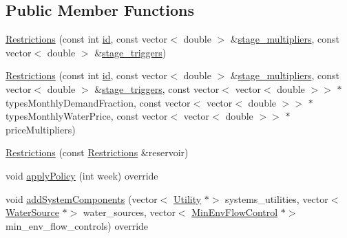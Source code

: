 \subsection*{Public Member Functions}
\begin{DoxyCompactItemize}
\item 
\mbox{\hyperlink{classRestrictions_aec6f37bfaec7d6e22e82945289fd9acc_aec6f37bfaec7d6e22e82945289fd9acc}{Restrictions}} (const int \mbox{\hyperlink{classDroughtMitigationPolicy_abf3ed19ed98e0d74dc9ae24094be640b_abf3ed19ed98e0d74dc9ae24094be640b}{id}}, const vector$<$ double $>$ \&\mbox{\hyperlink{classRestrictions_ae05c6899c05a7ffe39c4ceb7cdcd3daf_ae05c6899c05a7ffe39c4ceb7cdcd3daf}{stage\+\_\+multipliers}}, const vector$<$ double $>$ \&\mbox{\hyperlink{classRestrictions_a1c519068b4ab14737f726817f1edf9d0_a1c519068b4ab14737f726817f1edf9d0}{stage\+\_\+triggers}})
\item 
\mbox{\hyperlink{classRestrictions_a78083b572f1368bb863d40d7da807077_a78083b572f1368bb863d40d7da807077}{Restrictions}} (const int \mbox{\hyperlink{classDroughtMitigationPolicy_abf3ed19ed98e0d74dc9ae24094be640b_abf3ed19ed98e0d74dc9ae24094be640b}{id}}, const vector$<$ double $>$ \&\mbox{\hyperlink{classRestrictions_ae05c6899c05a7ffe39c4ceb7cdcd3daf_ae05c6899c05a7ffe39c4ceb7cdcd3daf}{stage\+\_\+multipliers}}, const vector$<$ double $>$ \&\mbox{\hyperlink{classRestrictions_a1c519068b4ab14737f726817f1edf9d0_a1c519068b4ab14737f726817f1edf9d0}{stage\+\_\+triggers}}, const vector$<$ vector$<$ double $>$$>$ $\ast$types\+Monthly\+Demand\+Fraction, const vector$<$ vector$<$ double $>$$>$ $\ast$types\+Monthly\+Water\+Price, const vector$<$ vector$<$ double $>$$>$ $\ast$price\+Multipliers)
\item 
\mbox{\hyperlink{classRestrictions_aa8653b70ff7eedb4e8fc1b21ebf2ead9_aa8653b70ff7eedb4e8fc1b21ebf2ead9}{Restrictions}} (const \mbox{\hyperlink{classRestrictions}{Restrictions}} \&reservoir)
\item 
void \mbox{\hyperlink{classRestrictions_a1ef7559adc034bdddd047ee776b5f9a9_a1ef7559adc034bdddd047ee776b5f9a9}{apply\+Policy}} (int week) override
\item 
void \mbox{\hyperlink{classRestrictions_ab0a2b62495d6cdd8d1fedba419c05c37_ab0a2b62495d6cdd8d1fedba419c05c37}{add\+System\+Components}} (vector$<$ \mbox{\hyperlink{classUtility}{Utility}} $\ast$$>$ systems\+\_\+utilities, vector$<$ \mbox{\hyperlink{classWaterSource}{Water\+Source}} $\ast$$>$ water\+\_\+sources, vector$<$ \mbox{\hyperlink{classMinEnvFlowControl}{Min\+Env\+Flow\+Control}} $\ast$$>$ min\+\_\+env\+\_\+flow\+\_\+controls) override

\end{DoxyCompactItemize}
